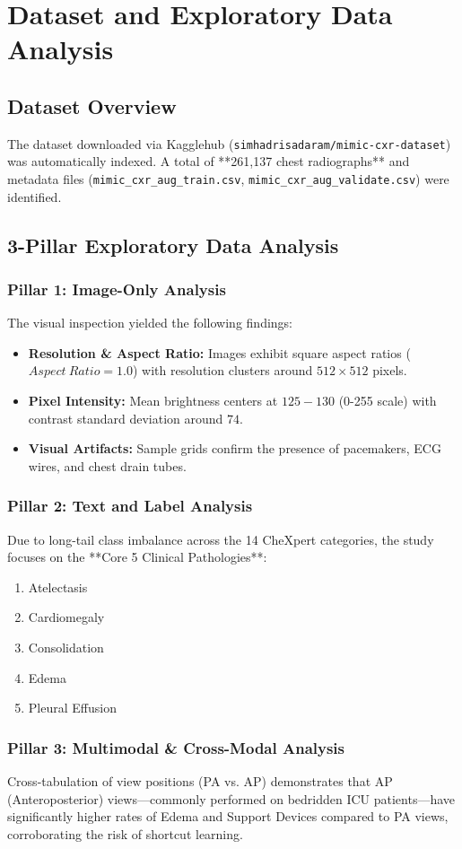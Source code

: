 \chapter{Dataset and Exploratory Data Analysis}
\label{ch:dataset_and_eda}

\section{Dataset Overview}
The dataset downloaded via Kagglehub (\texttt{simhadrisadaram/mimic-cxr-dataset}) was automatically indexed. A total of **261,137 chest radiographs** and metadata files (\texttt{mimic\_cxr\_aug\_train.csv}, \texttt{mimic\_cxr\_aug\_validate.csv}) were identified.

\section{3-Pillar Exploratory Data Analysis}

\subsection{Pillar 1: Image-Only Analysis}
The visual inspection yielded the following findings:
\begin{itemize}
    \item \textbf{Resolution \& Aspect Ratio:} Images exhibit square aspect ratios ($Aspect\ Ratio = 1.0$) with resolution clusters around $512 \times 512$ pixels.
    \item \textbf{Pixel Intensity:} Mean brightness centers at $125-130$ (0-255 scale) with contrast standard deviation around $74$.
    \item \textbf{Visual Artifacts:} Sample grids confirm the presence of pacemakers, ECG wires, and chest drain tubes.
\end{itemize}

\subsection{Pillar 2: Text and Label Analysis}
Due to long-tail class imbalance across the 14 CheXpert categories, the study focuses on the **Core 5 Clinical Pathologies**:
\begin{enumerate}
    \item Atelectasis
    \item Cardiomegaly
    \item Consolidation
    \item Edema
    \item Pleural Effusion
\end{enumerate}

\subsection{Pillar 3: Multimodal \& Cross-Modal Analysis}
Cross-tabulation of view positions (PA vs. AP) demonstrates that AP (Anteroposterior) views—commonly performed on bedridden ICU patients—have significantly higher rates of Edema and Support Devices compared to PA views, corroborating the risk of shortcut learning.
